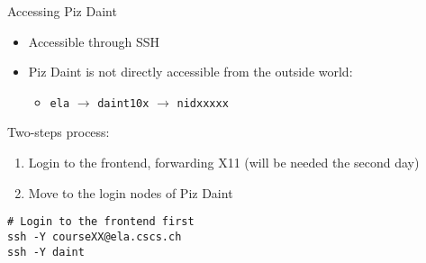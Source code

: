 \begin{frame}[fragile]{Accessing Piz Daint}
  \begin{itemize}
  \item Accessible through SSH
  \item Piz Daint is not directly accessible from the outside world:
    \begin{itemize}
    \item \texttt{ela} $\rightarrow$ \texttt{daint10x} $\rightarrow$ \texttt{nidxxxxx}
    \end{itemize}
  \end{itemize}

  Two-steps process:
  \begin{enumerate}
  \item Login to the frontend, forwarding X11 (will be needed the second day)
  \item Move to the login nodes of Piz Daint
  \end{enumerate}

  \vfill
  \begin{lstlisting}[style=shstyle]
# Login to the frontend first
ssh -Y courseXX@ela.cscs.ch
ssh -Y daint
  \end{lstlisting}
\end{frame}
